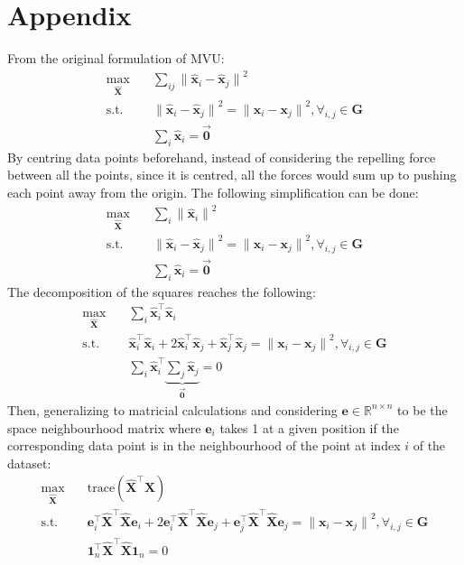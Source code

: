 \section{Appendix}




From the original formulation of MVU:
\begin{align}
    \max_{\bm{\hat{X}}} \quad & \sum_{ij} {\| \bm{\hat{x}}_i - \bm{\hat{x}}_j \|}^2 \\
    \textrm{s.t.} \quad 
        & {\| \bm{\hat{x}}_i - \bm{\hat{x}}_j \|}^2 = {\| \bm{x}_i - \bm{x}_j \|}^2, \forall_{i,j} \in\bm{G} \\
        & \sum_i \bm{\hat{x}}_i = \bm{\vec{0}}
\end{align}
By centring data points beforehand, instead of considering the repelling force between all the points, since it is centred, all the forces would sum up to pushing each point away from the origin. The following simplification can be done:
\begin{align}
    \max_{\bm{\hat{X}}} \quad & \sum_i {\| \bm{\hat{x}}_i \|}^2 \\
    \textrm{s.t.} \quad 
        & {\| \bm{\hat{x}}_i - \bm{\hat{x}}_j \|}^2 = {\| \bm{x}_i - \bm{x}_j \|}^2, \forall_{i,j} \in\bm{G} \\
        & \sum_i \bm{\hat{x}}_i = \bm{\vec{0}}
\end{align}
The decomposition of the squares reaches the following:
\begin{align}
    \max_{\bm{\hat{X}}} \quad & \sum_i \bm{\hat{x}}_i^\top \bm{\hat{x}}_i \\
    \textrm{s.t.} \quad 
        & \bm{\hat{x}}_i^\top \bm{\hat{x}}_i + 2\bm{\hat{x}}_i^\top \bm{\hat{x}}_j + \bm{\hat{x}}_j^\top \bm{\hat{x}}_j = {\| \bm{x}_i - \bm{x}_j \|}^2, \forall_{i,j} \in\bm{G} \\
        & \sum_i \bm{\hat{x}}_i^\top \underbrace{\sum_j \bm{\hat{x}}_j}_{\bm{\vec{0}}} = 0
\end{align}
Then, generalizing to matricial calculations and considering $\bm{e}\in\mathbb{R}^{n\times n}$ to be the space neighbourhood matrix where $\bm{e}_i$ takes 1 at a given position if the corresponding data point is in the neighbourhood of the point at index $i$ of the dataset:
\begin{align}
    \max_{\bm{\hat{X}}} \quad
        & \text{trace}\left( \bm{\hat{X}}^\top \bm{\hat{X}} \right) \\
    \textrm{s.t.} \quad 
        & \bm{e}_i^\top \bm{\hat{X}}^\top \bm{\hat{X}} \bm{e}_i + 2 \bm{e}_i^\top \bm{\hat{X}}^\top \bm{\hat{X}} \bm{e}_j + \bm{e}_j^\top \bm{\hat{X}}^\top \bm{\hat{X}} \bm{e}_j = {\| \bm{x}_i - \bm{x}_j \|}^2, \forall_{i,j} \in\bm{G} \\
        & \bm{1}_n^\top \bm{\hat{X}}^\top \bm{\hat{X}} \bm{1}_n = 0
\end{align}

